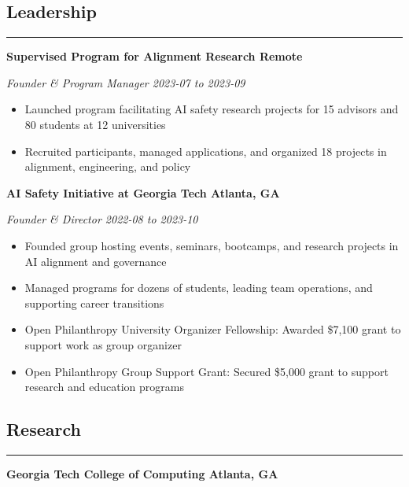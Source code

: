\documentclass{article}
\newcommand{\headingOne}[1]{
    \subsection*{#1} \hrule
    \vspace*{6pt}
}
\newcommand{\headingTwo}[2]{
    \vspace*{6pt}
    \textbf{#1 \hfill #2}
}
\newcommand{\headingThree}[2]{
    \vspace*{2pt}
    \textsl{#1 \hfill #2}
}
\begin{document}
\headingOne{Leadership}


\headingTwo{Supervised Program for Alignment Research}{Remote}

\headingThree{Founder \& Program Manager}{2023-07 to 2023-09}
\begin{itemize}
    \item Launched program facilitating AI safety research projects for 15 advisors and 80 students at 12 universities
    \item Recruited participants, managed applications, and organized 18 projects in alignment, engineering, and policy
\end{itemize}


\headingTwo{AI Safety Initiative at Georgia Tech}{Atlanta, GA}

\headingThree{Founder \& Director}{2022-08 to 2023-10}
\begin{itemize}
    \item Founded group hosting events, seminars, bootcamps, and research projects in AI alignment and governance
    \item Managed programs for dozens of students, leading team operations, and supporting career transitions
    \item Open Philanthropy University Organizer Fellowship: Awarded \$7,100 grant to support work as group organizer
    \item Open Philanthropy Group Support Grant: Secured \$5,000 grant to support research and education programs
\end{itemize}





\headingOne{Research}


\headingTwo{Georgia Tech College of Computing}{Atlanta, GA}
\end{document}
